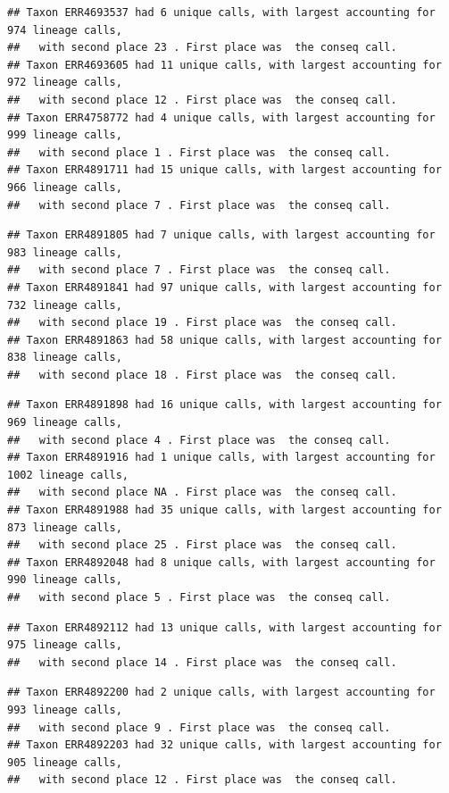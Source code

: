 \documentclass[
]{article}
\begin{document}
\begin{verbatim}
## Taxon ERR4693537 had 6 unique calls, with largest accounting for 974 lineage calls, 
##   with second place 23 . First place was  the conseq call.
## Taxon ERR4693605 had 11 unique calls, with largest accounting for 972 lineage calls, 
##   with second place 12 . First place was  the conseq call.
## Taxon ERR4758772 had 4 unique calls, with largest accounting for 999 lineage calls, 
##   with second place 1 . First place was  the conseq call.
## Taxon ERR4891711 had 15 unique calls, with largest accounting for 966 lineage calls, 
##   with second place 7 . First place was  the conseq call.
\end{verbatim}

\begin{verbatim}
## Taxon ERR4891805 had 7 unique calls, with largest accounting for 983 lineage calls, 
##   with second place 7 . First place was  the conseq call.
## Taxon ERR4891841 had 97 unique calls, with largest accounting for 732 lineage calls, 
##   with second place 19 . First place was  the conseq call.
## Taxon ERR4891863 had 58 unique calls, with largest accounting for 838 lineage calls, 
##   with second place 18 . First place was  the conseq call.
\end{verbatim}

\begin{verbatim}
## Taxon ERR4891898 had 16 unique calls, with largest accounting for 969 lineage calls, 
##   with second place 4 . First place was  the conseq call.
## Taxon ERR4891916 had 1 unique calls, with largest accounting for 1002 lineage calls, 
##   with second place NA . First place was  the conseq call.
## Taxon ERR4891988 had 35 unique calls, with largest accounting for 873 lineage calls, 
##   with second place 25 . First place was  the conseq call.
## Taxon ERR4892048 had 8 unique calls, with largest accounting for 990 lineage calls, 
##   with second place 5 . First place was  the conseq call.
\end{verbatim}

\begin{verbatim}
## Taxon ERR4892112 had 13 unique calls, with largest accounting for 975 lineage calls, 
##   with second place 14 . First place was  the conseq call.
\end{verbatim}

\begin{verbatim}
## Taxon ERR4892200 had 2 unique calls, with largest accounting for 993 lineage calls, 
##   with second place 9 . First place was  the conseq call.
## Taxon ERR4892203 had 32 unique calls, with largest accounting for 905 lineage calls, 
##   with second place 12 . First place was  the conseq call.
\end{verbatim}
\end{document}
